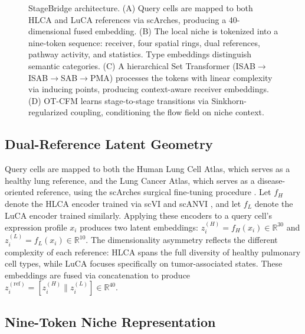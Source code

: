 \documentclass[conference]{IEEEtran}
\begin{document}
\begin{figure}[t]
\caption{StageBridge architecture. (A) Query cells are mapped to both HLCA and LuCA references via scArches, producing a 40-dimensional fused embedding. (B) The local niche is tokenized into a nine-token sequence: receiver, four spatial rings, dual references, pathway activity, and statistics. Type embeddings distinguish semantic categories. (C) A hierarchical Set Transformer (ISAB$\to$ISAB$\to$SAB$\to$PMA) processes the tokens with linear complexity via inducing points, producing context-aware receiver embeddings. (D) OT-CFM learns stage-to-stage transitions via Sinkhorn-regularized coupling, conditioning the flow field on niche context.}
\label{fig:architecture}
\end{figure}

\subsection{Dual-Reference Latent Geometry}

Query cells are mapped to both the Human Lung Cell Atlas, which serves as a healthy lung reference, and the Lung Cancer Atlas, which serves as a disease-oriented reference, using the scArches surgical fine-tuning procedure \cite{Lotfollahi2022-fc}. Let $f_H$ denote the HLCA encoder trained via scVI and scANVI \cite{Lopez2018-ns}, and let $f_L$ denote the LuCA encoder trained similarly. Applying these encoders to a query cell's expression profile $x_i$ produces two latent embeddings: $z_i^{(H)} = f_H(x_i) \in \mathbb{R}^{30}$ and $z_i^{(L)} = f_L(x_i) \in \mathbb{R}^{10}$. The dimensionality asymmetry reflects the different complexity of each reference: HLCA spans the full diversity of healthy pulmonary cell types, while LuCA focuses specifically on tumor-associated states. These embeddings are fused via concatenation to produce $z_i^{(\text{ref})} = [z_i^{(H)} \| z_i^{(L)}] \in \mathbb{R}^{40}$.

\subsection{Nine-Token Niche Representation}
\end{document}
